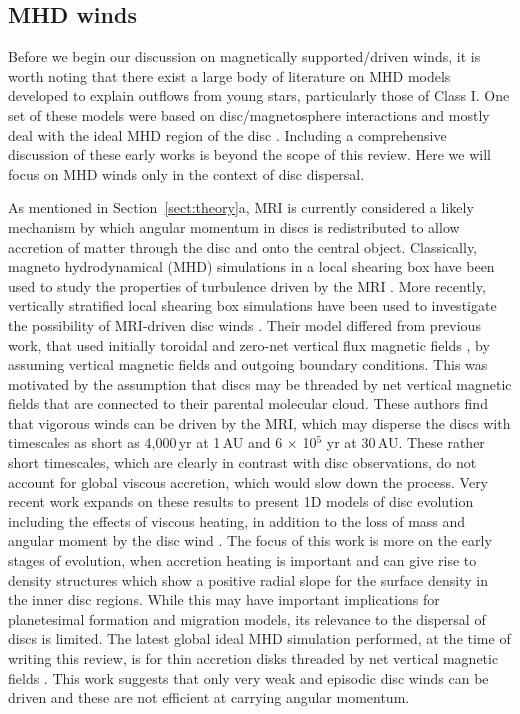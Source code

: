 \documentclass{rsos}
\begin{document}
\subsection{MHD winds}

Before we begin our discussion on magnetically supported/driven winds, it is worth noting that there exist a large body of literature on MHD models developed to explain outflows from young stars, particularly those of Class I. One set of these models were based on disc/magnetosphere interactions and mostly deal with the ideal MHD region of the disc 
\cite{1994ApJ...429..781S,2006A&A...453..785F}. Including a comprehensive discussion of these early works is beyond the scope of this review. Here we will focus on MHD winds only in the context of disc dispersal. 

As mentioned in Section~\ref{sect:theory}a, MRI \cite{1991ApJ...376..214B} is currently considered a likely mechanism by which angular momentum in discs is redistributed to allow accretion of matter through the disc and onto the central object. Classically, magneto hydrodynamical (MHD) simulations in a local shearing box have been used to study the properties of turbulence driven by the MRI 
\cite{1995ApJ...440..742H}. More recently,   vertically stratified local shearing box simulations have been used to investigate the possibility of MRI-driven disc winds \cite{2009ApJ...691L..49S, 2010ApJ...718.1289S}. Their model differed from previous work, that used initially toroidal and zero-net vertical flux magnetic fields 
\cite{2000ApJ...534..398M}, by assuming vertical magnetic fields and outgoing boundary conditions. This was motivated by the assumption that discs may be threaded by net vertical magnetic fields that are connected to their parental molecular cloud. These authors find that vigorous winds can be driven by the MRI, which may disperse the discs with timescales as short as 4,000\,yr at 1\,AU and 6 $\times$ 10$^5$ yr at 30\,AU. These rather short timescales, which are clearly in contrast with disc observations, do not account for global viscous accretion, which would slow down the process. Very recent work expands on these results to present 1D models of disc evolution including the effects of viscous heating, in addition to the loss of mass and angular moment by the disc wind \cite{2016ApJ...821....3M}. The focus of this work is more on the early stages of evolution, when accretion heating is important and can give rise to density structures which show a positive radial slope for the surface density in the inner disc regions. While this may have important implications for planetesimal formation and migration models, its relevance to the dispersal of discs is limited. 
The latest global ideal MHD simulation performed, at the time of writing this review, is for thin accretion disks threaded by net vertical magnetic fields  \cite{2017arXiv170104627Z}. This work suggests that only very weak and episodic disc winds can be driven and these are not efficient at carrying angular momentum. 
\end{document}

